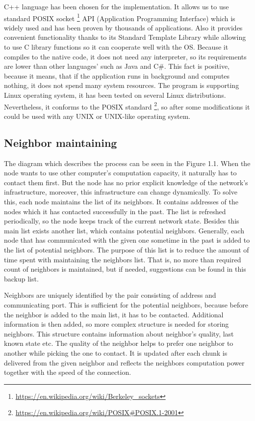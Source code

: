 C++ language has been chosen for the implementation. It allows us to use
standard POSIX socket
\footnote{\url{https://en.wikipedia.org/wiki/Berkeley\_sockets}} API
(Application Programming Interface) which is widely used and has been
proven by thousands of applications. Also it provides convenient
functionality thanks to its Standard Template Library while allowing to
use C library functions so it can cooperate well with the OS. Because it
compiles to the native code, it does not need any interpreter, so its
requirements are lower than other languages' such as Java and C\#. This
fact is positive, because it means, that if the application runs in
background and computes nothing, it does not spend many system
resources. The program is supporting Linux operating system, it has been
tested on several Linux distributions. Nevertheless, it conforms to the
POSIX standard
\footnote{\url{https://en.wikipedia.org/wiki/POSIX\#POSIX.1-2001}}, so
after some modifications it could be used with any UNIX or UNIX-like
operating system.

\subsection{Neighbor maintaining}\label{neighbor-maintaining}

The diagram which describes the process can be seen in the Figure 1.1.
When the node wants to use other computer's computation capacity, it
naturally has to contact them first. But the node has no prior explicit
knowledge of the network's infrastructure, moreover, this infrastructure
can change dynamically. To solve this, each node maintains the list of
its neighbors. It contains addresses of the nodes which it has contacted
successfully in the past. The list is refreshed periodically, so the
node keeps track of the current network state. Besides this main list
exists another list, which contains potential neighbors. Generally, each
node that has communicated with the given one sometime in the past is
added to the list of potential neighbors. The purpose of this list is to
reduce the amount of time spent with maintaining the neighbors list.
That is, no more than required count of neighbors is maintained, but if
needed, suggestions can be found in this backup list.

Neighbors are uniquely identified by the pair consisting of address and
communicating port. This is sufficient for the potential neighbors,
because before the neighbor is added to the main list, it has to be
contacted. Additional information is then added, so more complex
structure is needed for storing neighbors. This structure contains
information about neighbor's quality, last known state etc. The quality
of the neighbor helps to prefer one neighbor to another while picking
the one to contact. It is updated after each chunk is delivered from the
given neighbor and reflects the neighbors computation power together
with the speed of the connection.

